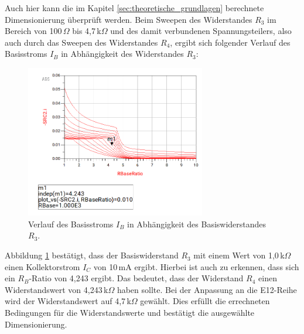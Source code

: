 Auch hier kann die im Kapitel \ref{sec:theoretische_grundlagen} berechnete Dimensionierung überprüft werden. Beim Sweepen des Widerstandes $R_3$ im Bereich von 100\,\(\Omega\) bis 4,7\,k\(\Omega\) und des damit verbundenen Spannungsteilers, also auch durch das Sweepen des Widerstandes $R_4$, ergibt sich folgender Verlauf des Basisstroms $I_B$ in Abhängigkeit des Widerstandes $R_3$:
\begin{figure}[H]
    \centering
    \includegraphics[width=0.7\textwidth]{Pictures/RBase.png}
    \caption{Verlauf des Basisstroms $I_B$ in Abhängigkeit des Basiswiderstandes $R_3$.}
    \label{fig:RBase}
\end{figure}
Abbildung \ref{fig:RBase} bestätigt, dass der Basiswiderstand $R_3$ mit einem Wert von 1{,}0\,k\(\Omega\) einen Kollektorstrom $I_C$ von 10\,mA ergibt. Hierbei ist auch zu erkennen, dass sich ein $R_B$-Ratio von 4,243 ergibt. 
Das bedeutet, dass der Widerstand $R_4$ einen Widerstandswert von 4{,}243\,k\(\Omega\) haben sollte. Bei der Anpassung an die E12-Reihe wird der Widerstandswert auf 4{,}7\,k\(\Omega\) gewählt. 
Dies erfüllt die errechneten Bedingungen für die Widerstandswerte und bestätigt die ausgewählte Dimensionierung.

